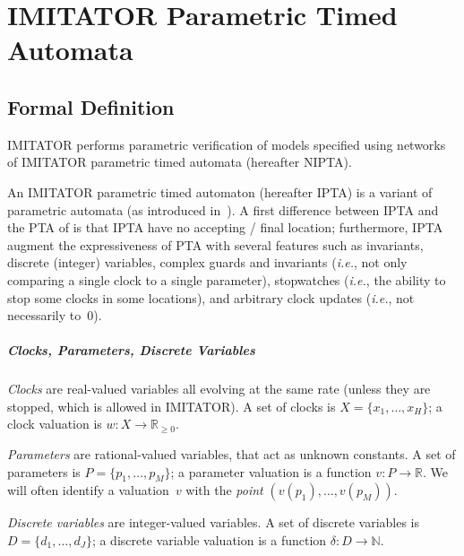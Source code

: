 \documentclass[a4paper,11pt]{report}
\newcommand{\Clock}{X} %
\newcommand{\ClockCard}{H} %
\newcommand{\clock}{x} %
\newcommand{\clockval}{w} %
\newcommand{\dval}{\ensuremath{\delta}} %
\newcommand{\DVar}{D} %
\newcommand{\dvar}{d} %
\newcommand{\DVarCard}{J} %
\newcommand{\Param}{P} %
\newcommand{\param}{p} %
\newcommand{\ParamCard}{M} %
\newcommand{\pval}{v} %
\newcommand{\grandn}{{\mathbb N}}
\newcommand{\grandr}{{\mathbb R}}
\newcommand{\grandrplus}{\grandr_{\geq 0}}
\newcommand{\imitator}{\textsf{IMITATOR}}
\newcommand{\IPTA}{IPTA}
\newcommand{\NIPTA}{NIPTA}
\newcommand{\ie}{\textcolor{colorok}{\textit{i.e.}, }}
\begin{document}
\chapter{IMITATOR Parametric Timed Automata}\label{section:IPTA}

\section{Formal Definition}

\imitator{} performs parametric verification of models specified using networks of \imitator{} parametric timed automata (hereafter \NIPTA{}).

An \imitator{} parametric timed automaton (hereafter \IPTA{}) is a variant of parametric automata (as introduced in~\cite{AHV93}).
A first difference between \IPTA{} and the PTA of \cite{AHV93} is that \IPTA{} have no accepting / final location;
furthermore, \IPTA{} augment the expressiveness of PTA with several features such as invariants, discrete (integer) variables, complex guards and invariants (\ie{} not only comparing a single clock to a single parameter), stopwatches (\ie{} the ability to stop some clocks in some locations), and arbitrary clock updates (\ie{} not necessarily to~0).

\paragraph{Clocks, Parameters, Discrete Variables}
\emph{Clocks} are real-valued variables all evolving at the same rate (unless they are stopped, which is allowed in \imitator{}).
A set of clocks is $\Clock = \{ \clock_1, \dots, \clock_\ClockCard \}$;
a clock valuation is
$\clockval \colon \Clock \rightarrow \grandrplus$.

\emph{Parameters} are rational-valued variables, that act as unknown constants.
A set of parameters is $\Param = \{ \param_1, \dots, \param_\ParamCard \} $;
a parameter valuation is a function $\pval\colon \Param \rightarrow \grandr$.
We will often identify a valuation~$\pval$ with the \emph{point} $(\pval(\param_1), \dots, \pval(\param_{\ParamCard}))$.

\emph{Discrete variables} are integer-valued variables.
A set of discrete variables is $\DVar = \{ \dvar_1, \dots, \dvar_\DVarCard \} $;
a discrete variable valuation is a function $\dval \colon \DVar \rightarrow \grandn$.
\end{document}
